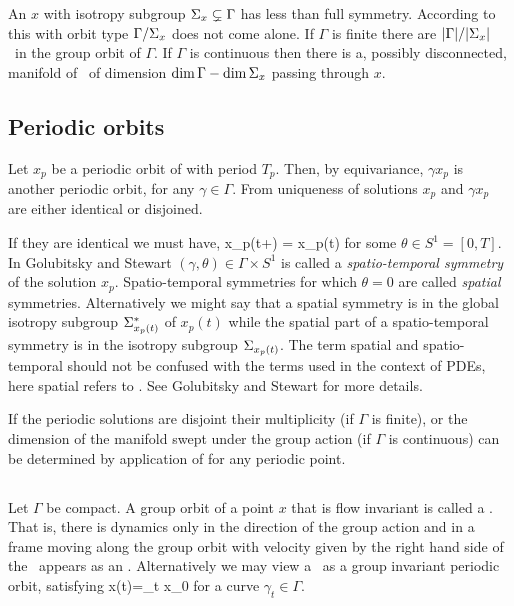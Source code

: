An {\eqv} $x$ with isotropy subgroup
$\Sigma_{x}\subsetneq\Gamma$ has less than full symmetry.
According to  this {\eqv} with orbit
type $\Gamma/\Sigma_{x}$ does not come alone. If $\Gamma$ is
finite there are  $|\Gamma|/|\Sigma_{x}|$ \eqva\ in the group
orbit of $\Gamma$. If $\Gamma$ is continuous then there is a,
possibly disconnected, manifold of \eqva\ of dimension
$\dim \Gamma - \dim \Sigma_{x}$ passing through $x$.

\subsection{Periodic orbits}
\label{sec:poSym}

Let $x_p$ be a periodic orbit of  with period $T_p$. Then, by equivariance, $\gamma x_p$
is another periodic orbit, for any $\gamma\in\Gamma$. From uniqueness of solutions $x_p$ and $\gamma x_p$
are either identical or disjoined.

If they are identical we must have,
\beq
	\gamma x_p(t+\theta) = x_p(t)
\eeq
for some $\theta\in S^{1}=[0,T]$. In Golubitsky and Stewart $(\gamma,\theta)\in \Gamma \times S^1$ is called a \emph{spatio-temporal
symmetry} of the solution $x_p$. Spatio-temporal symmetries for which $\theta=0$ are called \emph{spatial}
symmetries. Alternatively we might say that a spatial symmetry is in the global isotropy subgroup $\Sigma^*_{x_p(t)}$ of $x_p(t)$ while the spatial part of a spatio-temporal symmetry is in the isotropy subgroup $\Sigma_{x_p(t)}$.
The term spatial and spatio-temporal should not be confused with the terms used in the context of PDEs, here
spatial refers to \statesp. See Golubitsky and Stewart for more details.

If the periodic solutions are disjoint their multiplicity (if $\Gamma$ is finite), or the dimension
of the manifold swept under the group action (if $\Gamma$ is continuous) can be determined by application
of  for any periodic point.

\subsection{\Reqva}

Let $\Gamma$ be compact. A group orbit of a point $x$ that is flow invariant is called a \reqv.
That is, there is dynamics only in the direction of the group action and in a frame moving along the group orbit with velocity given by the right hand side of  the \reqv\ appears as an \eqv. Alternatively
we may view a \reqv\ as a group invariant periodic orbit, satisfying
\beq
	x(t)=\gamma_t x_0
\eeq
for a curve $\gamma_t\in\Gamma$.

